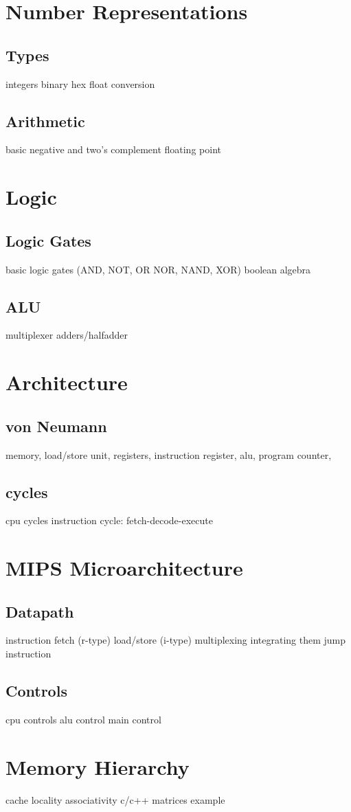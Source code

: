 \section{Number Representations}
\subsection{Types}
integers
binary
hex
float
conversion

\subsection{Arithmetic}
basic
negative and two's complement
floating point

\section{Logic}
\subsection{Logic Gates}
basic logic gates (AND, NOT, OR NOR, NAND, XOR)
boolean algebra
\subsection{ALU}
multiplexer
adders/halfadder

\section{Architecture}
\subsection{von Neumann}
memory, load/store unit, registers, instruction register, alu, program counter, 

\subsection{cycles}
cpu cycles
instruction cycle: fetch-decode-execute

\section{MIPS Microarchitecture}
\subsection{Datapath}
instruction fetch (r-type)
load/store (i-type)
multiplexing
integrating them
jump instruction

\subsection{Controls}
cpu controls
alu control
main control

\section{Memory Hierarchy}
cache
locality
associativity
c/c++ matrices example